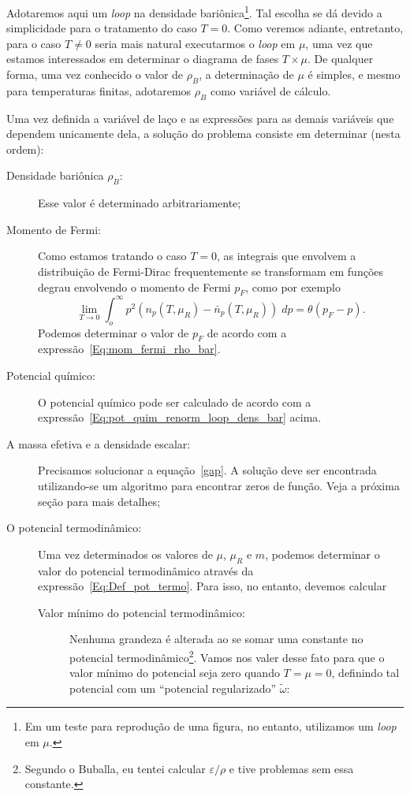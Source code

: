 Adotaremos aqui um \emph{loop} na densidade bariônica\footnote{Em um teste para reprodução de uma figura, no entanto, utilizamos um \emph{loop} em $\mu$.}. Tal escolha se dá devido a simplicidade para o tratamento do caso $T = 0$. Como veremos adiante, entretanto, para o caso $T \neq 0$ seria mais natural executarmos o \emph{loop} em $\mu$, uma vez que estamos interessados em determinar o diagrama de fases $T \times \mu$. De qualquer forma, uma vez conhecido o valor de $\rho_B$, a determinação de $\mu$ é simples, e mesmo para temperaturas finitas, adotaremos $\rho_B$ como variável de cálculo.

Uma vez definida a variável de laço e as expressões para as demais variáveis que dependem unicamente dela, a solução do problema consiste em determinar (nesta ordem):
\begin{description}
	\item[Densidade bariônica $\rho_B$:] Esse valor é determinado arbitrariamente;
	\item[Momento de Fermi:] Como estamos tratando o caso $T = 0$, as integrais que envolvem a distribuição de Fermi-Dirac frequentemente se transformam em funções degrau envolvendo o momento de Fermi $p_F$, como por exemplo
		\begin{equation}
			\lim_{T \to 0} \int_o^\infty p^2 (n_p(T, \mu_R) - \bar{n}_p(T, \mu_R)) \;dp = \theta(p_F - p).
		\end{equation}
		Podemos determinar o valor de $p_F$ de acordo com a expressão~\eqref{Eq:mom_fermi_rho_bar}.
	\item[Potencial químico:] O potencial químico pode ser calculado de acordo com a expressão~\eqref{Eq:pot_quim_renorm_loop_dens_bar} acima.
	\item[A massa efetiva e a densidade escalar:] Precisamos solucionar a equação~\eqref{gap}. A solução deve ser encontrada utilizando-se um algoritmo para encontrar zeros de função. Veja a próxima seção para mais detalhes;
	\item[O potencial termodinâmico:] Uma vez determinados os valores de $\mu$, $\mu_R$ e $m$, podemos determinar o valor do potencial termodinâmico através da expressão~\eqref{Eq:Def_pot_termo}. Para isso, no entanto, devemos calcular
		\begin{description}
			\item[Valor mínimo do potencial termodinâmico:] Nenhuma grandeza é alterada ao se somar uma constante no potencial termodinâmico\footnote{Segundo o Buballa, eu tentei calcular $\varepsilon/\rho$ e tive problemas sem essa constante.}. Vamos nos valer desse fato para que o valor mínimo do potencial seja zero quando $T = \mu = 0$, definindo tal potencial com um ``potencial regularizado'' $\tilde\omega$:

\end{description}
\end{description}
